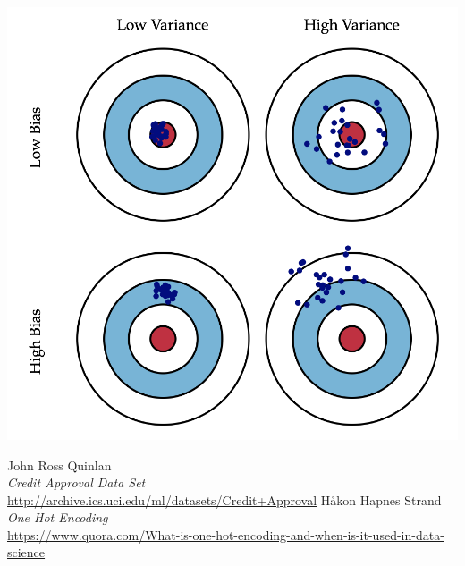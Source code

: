\documentclass[a4paper,8pt]{article}
\newenvironment{Figure}
  {\par\medskip\noindent\minipage{\linewidth}}
  {\endminipage\par\medskip}
\begin{document}
\begin{multicols}{2}
\begin{Figure}
 \includegraphics[width=\linewidth]{BiasVariance}
\end{Figure}

\end{multicols}

\begin{thebibliography}{10}
	John Ross Quinlan \\
	\emph{Credit Approval Data Set} \\
	\url{http://archive.ics.uci.edu/ml/datasets/Credit+Approval}
	Håkon Hapnes Strand \\
	\emph{One Hot Encoding} \\
	\url{https://www.quora.com/What-is-one-hot-encoding-and-when-is-it-used-in-data-science}
	
\end{thebibliography}
\end{document}
